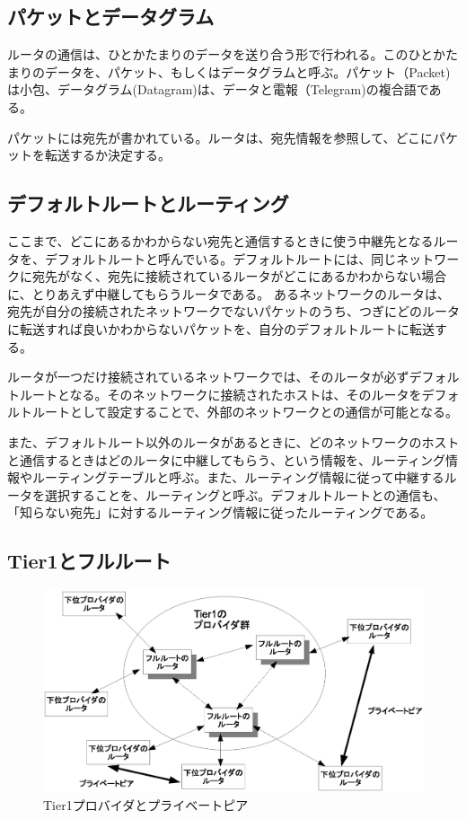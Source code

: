 \subsection{パケットとデータグラム}

ルータの通信は、ひとかたまりのデータを送り合う形で行われる。このひとかたまりのデータを、パケット、もしくはデータグラムと呼ぶ。パケット（Packet)は小包、データグラム(Datagram)は、データと電報（Telegram)の複合語である。

パケットには宛先が書かれている。ルータは、宛先情報を参照して、どこにパケットを転送するか決定する。

\subsection{デフォルトルートとルーティング}

ここまで、どこにあるかわからない宛先と通信するときに使う中継先となるルータを、デフォルトルートと呼んでいる。デフォルトルートには、同じネットワークに宛先がなく、宛先に接続されているルータがどこにあるかわからない場合に、とりあえず中継してもらうルータである。
あるネットワークのルータは、宛先が自分の接続されたネットワークでないパケットのうち、つぎにどのルータに転送すれば良いかわからないパケットを、自分のデフォルトルートに転送する。

ルータが一つだけ接続されているネットワークでは、そのルータが必ずデフォルトルートとなる。そのネットワークに接続されたホストは、そのルータをデフォルトルートとして設定することで、外部のネットワークとの通信が可能となる。

また、デフォルトルート以外のルータがあるときに、どのネットワークのホストと通信するときはどのルータに中継してもらう、という情報を、ルーティング情報やルーティングテーブルと呼ぶ。また、ルーティング情報に従って中継するルータを選択することを、ルーティングと呼ぶ。デフォルトルートとの通信も、「知らない宛先」に対するルーティング情報に従ったルーティングである。


\subsection{Tier1とフルルート}

\begin{figure}[htbp]
	\includegraphics[width=12cm,clip]{draw/tier1.eps}
	\caption{Tier1プロバイダとプライベートピア}
	\label{fig:tier1}
\end{figure}


